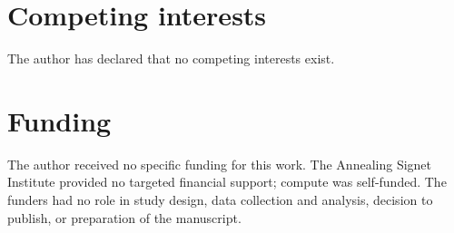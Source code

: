 \section*{Competing interests}
The author has declared that no competing interests exist.

\section*{Funding}
The author received no specific funding for this work. The Annealing Signet Institute
provided no targeted financial support; compute was self-funded. The funders had no
role in study design, data collection and analysis, decision to publish, or
preparation of the manuscript.


%


